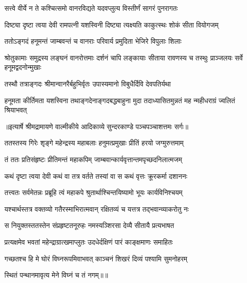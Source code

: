 \twolineshloka
{सत्त्वे वीर्ये न ते कश्चित्समो वानरविद्यते}
{यदवप्लुत्य विस्तीर्णं सागरं पुनरागतः} %

\twolineshloka
{दिष्ट्या दृष्टा त्वया देवी रामपत्नी यशस्विनी}
{दिष्ट्या त्यक्ष्यति काकुत्स्थः शोकं सीता वियोगजम्} %

\twolineshloka
{ततोऽङ्गदं हनूमन्तं जाम्बवन्तं च वानराः}
{परिवार्य प्रमुदिता भेजिरे विपुलाः शिलाः} %

\threelineshloka
{श्रोतुकामाः समुद्रस्य लङ्घनं वानरोत्तमाः}
{दर्शनं चापि लङ्कायाः सीताया रावणस्य च}
{तस्थुः प्राञ्जलयः सर्वे हनूमद्वदनोन्मुखाः} %

\twolineshloka
{तस्थौ तत्राङ्गदः श्रीमान्वानरैर्बहुभिर्वृतः}
{उपास्यमानो विबुधैर्दिवि देवपतिर्यथा} %

\fourlineindentedshloka
{हनूमता कीर्तिमता यशस्विना}
{ तथाङ्गदेनाङ्गदबद्धबाहुना}
{मुदा तदाध्यासितमुन्नतं मह}
{न्महीधराग्रं ज्वलितं श्रियाभवत्} %


{॥इत्यार्षे श्रीमद्रामायणे वाल्मीकीये आदिकाव्ये सुन्दरकाण्डे पञ्चपञ्चाशत्तमः सर्गः॥}


\twolineshloka
{ततस्तस्य गिरेः शृङ्गे महेन्द्रस्य महाबलाः}
{हनुमत्प्रमुखाः प्रीतिं हरयो जग्मुरुत्तमाम्} %

\twolineshloka
{तं ततः प्रतिसंहृष्टः प्रीतिमन्तं महाकपिम्}
{जाम्बवान्कार्यवृत्तान्तमपृच्छदनिलात्मजम्} %

\twolineshloka
{कथं दृष्टा त्वया देवी कथं वा तत्र वर्तते}
{तस्यां वा स कथं वृत्तः क्रूरकर्मा दशाननः} %

\twolineshloka
{तत्त्वतः सर्वमेतन्नः प्रब्रूहि त्वं महाकपे}
{श्रुतार्थाश्चिन्तयिष्यामो भूयः कार्यविनिश्चयम्} %

\twolineshloka
{यश्चार्थस्तत्र वक्तव्यो गतैरस्माभिरात्मवान्}
{रक्षितव्यं च यत्तत्र तद्भवान्व्याकरोतु नः} %

\twolineshloka
{स नियुक्तस्ततस्तेन संप्रहृष्टतनूरुहः}
{नमस्यञ्शिरसा देव्यै सीतायै प्रत्यभाषत} %

\twolineshloka
{प्रत्यक्षमेव भवतां महेन्द्राग्रात्खमाप्लुतः}
{उदधेर्दक्षिणं पारं काङ्क्षमाणः समाहितः} %

\twolineshloka
{गच्छतश्च हि मे घोरं विघ्नरूपमिवाभवत्}
{काञ्चनं शिखरं दिव्यं पश्यामि सुमनोहरम्} %

{स्थितं पन्थानमावृत्य मेने विघ्नं च तं नगम्॥॥} %

\addtocounter{shlokacount}{1}

